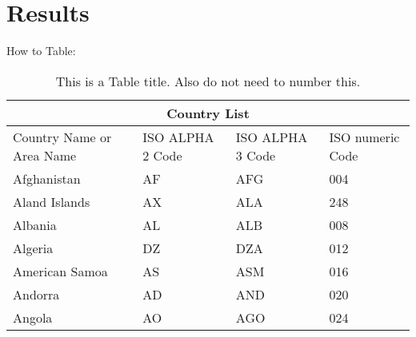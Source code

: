 \noindent \section{Results} \vspace{-9mm} \hrulefill %

\indent \lipsum[1-2] %

How to Table:
\begin{table}[H]
	\caption{This is a Table title. Also do not need to number this.}
	\begin{center}
		\begin{tabular}{ |p{3cm}||p{3cm}|p{3cm}|p{3cm}|  }
			\hline
			\multicolumn{4}{|c|}{Country List} \\
			\hline
			Country Name or Area Name & ISO ALPHA 2 Code & ISO ALPHA 3 Code & ISO numeric Code \\
			\hline
			Afghanistan & AF & AFG & 004 \\
			Aland Islands & AX & ALA & 248 \\
			Albania & AL & ALB &  008 \\
			Algeria & DZ & DZA &  012 \\
			American Samoa & AS & ASM & 016 \\
			Andorra & AD & AND & 020 \\
			Angola & AO & AGO & 024 \\
			\hline
		\end{tabular}
	\end{center}
	\vspace{-8.5mm}
\end{table}
